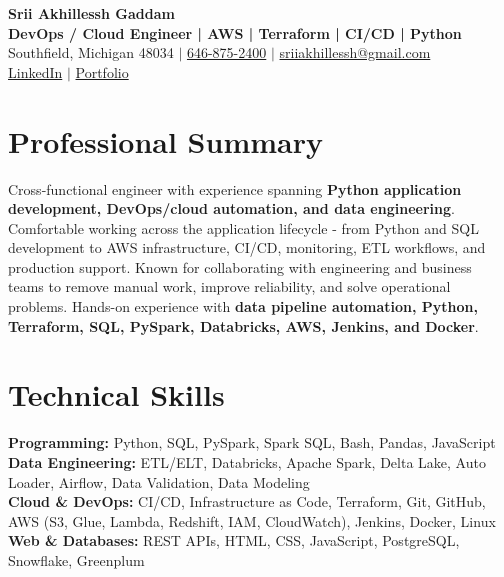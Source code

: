 \documentclass[letterpaper,10pt]{article}
\begin{document}
\fontsize{9.35pt}{10.45pt}\selectfont

\begin{center}
    {\LARGE \textbf{Srii Akhillessh Gaddam}} \\[-1pt]
    \textbf{DevOps / Cloud Engineer | AWS | Terraform | CI/CD | Python} \\[2pt]
    Southfield, Michigan 48034 $|$
    \href{tel:6468752400}{646-875-2400} $|$
    \href{mailto:sriiakhillessh@gmail.com}{sriiakhillessh@gmail.com} \\[1pt]
    \href{https://www.linkedin.com/in/srii-akhiilessh-gaddam-b48668191/}{LinkedIn} $|$
    \href{https://sriiakhillesshg.github.io/portfolio/}{Portfolio}
\end{center}
\vspace{-8pt}

\section{Professional Summary}
\small{Cross-functional engineer with experience spanning \textbf{Python application development, DevOps/cloud automation, and data engineering}. Comfortable working across the application lifecycle - from Python and SQL development to AWS infrastructure, CI/CD, monitoring, ETL workflows, and production support. Known for collaborating with engineering and business teams to remove manual work, improve reliability, and solve operational problems. Hands-on experience with \textbf{data pipeline automation, Python, Terraform, SQL, PySpark, Databricks, AWS, Jenkins, and Docker}.}

\section{Technical Skills}
\small{
\textbf{Programming:} Python, SQL, PySpark, Spark SQL, Bash, Pandas, JavaScript \\
\textbf{Data Engineering:} ETL/ELT, Databricks, Apache Spark, Delta Lake, Auto Loader, Airflow, Data Validation, Data Modeling \\
\textbf{Cloud \& DevOps:} CI/CD, Infrastructure as Code, Terraform, Git, GitHub, AWS (S3, Glue, Lambda, Redshift, IAM, CloudWatch), Jenkins, Docker, Linux \\
\textbf{Web \& Databases:} REST APIs, HTML, CSS, JavaScript, PostgreSQL, Snowflake, Greenplum
}
\end{document}
